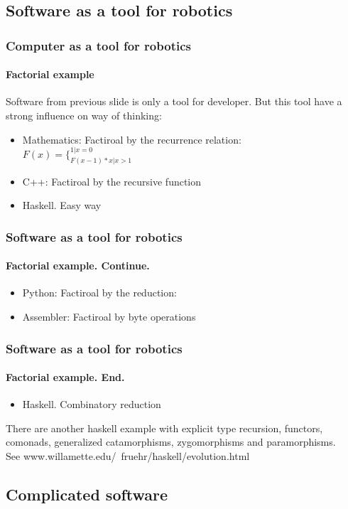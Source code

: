 \documentclass{beamer}
\begin{document}
\subsection{Software as a tool for robotics}
\begin{frame}
\frametitle{Computer as a tool for robotics}
\framesubtitle{Factorial example}
Software from previous slide is only a tool for developer. But this tool have a
strong influence on way of thinking:
\begin{itemize}
  \item<1> Mathematics: Factiroal by the recurrence relation: \\
  	\large $F(x) = {\{^{1 | x=0}_{F(x-1)*x | x>1}}$
  \item<1> C++: Factiroal by the recursive function	
		 
  \item<1> Haskell. Easy way
          
\end{itemize}
\normalsize
\end{frame}

\begin{frame}
\frametitle{Software as a tool for robotics}
\framesubtitle{Factorial example. Continue.}

\begin{itemize}
  \item<1> Python: Factiroal by the reduction:
	
  \item<1> Assembler: Factiroal by byte operations
		   
\end{itemize}
\end{frame}

\begin{frame}
\frametitle{Software as a tool for robotics}
\framesubtitle{Factorial example. End.}
\begin{itemize}
  \item<1> Haskell. Combinatory reduction
		
\end{itemize}

There are another haskell example with explicit type recursion, 
functors, comonads, generalized catamorphisms,
zygomorphisms and paramorphisms. \\ See
www.willamette.edu/~fruehr/haskell/evolution.html
\end{frame}


\subsection{Complicated software}
\end{document}

